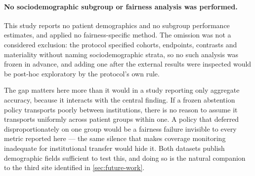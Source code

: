 \paragraph{No sociodemographic subgroup or fairness analysis was performed.}
This study reports no patient demographics and no subgroup performance
estimates, and applied no fairness-specific method. The omission was not a
considered exclusion: the protocol specified cohorts, endpoints, contrasts and
materiality without naming sociodemographic strata, so no such analysis was
frozen in advance, and adding one after the external results were inspected
would be post-hoc exploratory by the protocol's own rule.

The gap matters here more than it would in a study reporting only aggregate
accuracy, because it interacts with the central finding. If a frozen abstention
policy transports poorly between institutions, there is no reason to assume it
transports uniformly across patient groups within one. A policy that deferred
disproportionately on one group would be a fairness failure invisible to every
metric reported here --- the same silence that makes coverage monitoring
inadequate for institutional transfer would hide it. Both datasets publish
demographic fields sufficient to test this, and doing so is the natural
companion to the third site identified in \cref{sec:future-work}.
